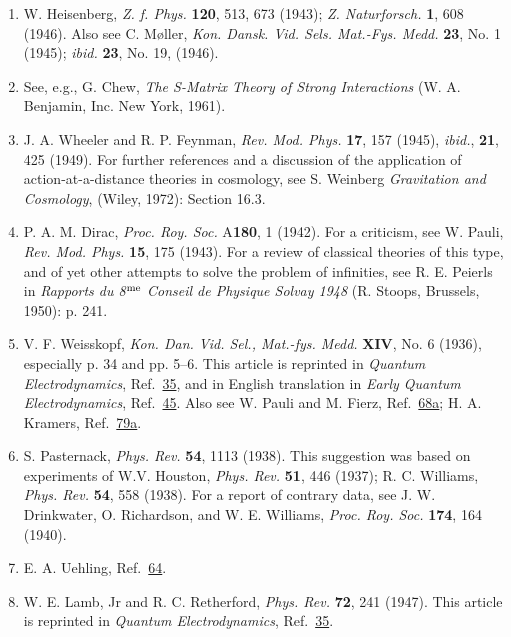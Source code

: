 \begin{enumerate}
\item\label{ref:1.72} W. Heisenberg, \emph{Z. f. Phys.} \textbf{120}, 513, 673 (1943);
\emph{Z. Naturforsch.} \textbf{1}, 608 (1946). Also see C. M\o ller, \emph{Kon.
Dansk. Vid. Sels. Mat.-Fys. Medd.} \textbf{23}, No. 1 (1945); \emph{ibid.}
\textbf{23}, No. 19, (1946).

\item\label{ref:1.73} See, e.g., G. Chew, \emph{The S-Matrix Theory of Strong Interactions}
(W. A. Benjamin, Inc. New York, 1961).

\item\label{ref:1.74} J. A. Wheeler and R. P. Feynman, \emph{Rev. Mod. Phys.} \textbf{17},
157 (1945), \emph{ibid.}, \textbf{21}, 425 (1949). For further references and a
discussion of the application of action-at-a-distance theories in cosmology,
see S. Weinberg \emph{Gravitation and Cosmology}, (Wiley, 1972): Section 16.3.

\item\label{ref:1.75} P. A. M. Dirac, \emph{Proc. Roy. Soc.} A\textbf{180}, 1 (1942). For a
criticism, see W. Pauli, \emph{Rev. Mod. Phys.} \textbf{15}, 175 (1943). For a
review of classical theories of this type, and of yet other attempts to solve
the problem of infinities, see R. E. Peierls in \emph{Rapports du 8$^{\rm me}$
Conseil de Physique Solvay 1948} (R. Stoops, Brussels, 1950): p. 241.

\item\label{ref:1.76} V. F. Weisskopf, \emph{Kon. Dan. Vid. Sel., Mat.-fys. Medd.}
\textbf{XIV}, No. 6 (1936), especially p. 34 and pp. 5--6. This article is
reprinted in \emph{Quantum Electrodynamics}, Ref.~\hyperref[ref:1.35]{35}, and in English
translation in \emph{Early Quantum Electrodynamics}, Ref.~\hyperref[ref:1.45]{45}. Also see W.
Pauli and M. Fierz, Ref.~\hyperref[ref:1.68a]{68a}; H. A. Kramers, Ref.~\hyperref[ref:1.79a]{79a}.

\item\label{ref:1.77} S. Pasternack, \emph{Phys. Rev.} \textbf{54}, 1113 (1938). This
suggestion was based on experiments of W.V. Houston, \emph{Phys. Rev.}
\textbf{51}, 446 (1937); R. C. Williams, \emph{Phys. Rev.} \textbf{54}, 558
(1938). For a report of contrary data, see J. W. Drinkwater, O. Richardson,
and W. E. Williams, \emph{Proc. Roy. Soc.} \textbf{174}, 164 (1940).

\item\label{ref:1.78} E. A. Uehling, Ref.~\hyperref[ref:1.64]{64}.

\item\label{ref:1.79} W. E. Lamb, Jr and R. C. Retherford, \emph{Phys. Rev.} \textbf{72}, 241
(1947). This article is reprinted in \emph{Quantum Electrodynamics}, Ref.~\hyperref[ref:1.35]{35}.


\end{enumerate}
